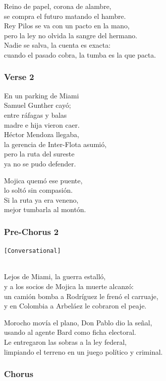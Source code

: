 Reino de papel, corona de alambre,\\
se compra el futuro matando el hambre.\\
Rey Pilos se va con un pacto en la mano,\\
pero la ley no olvida la sangre del hermano.\\
Nadie se salva, la cuenta es exacta:\\
cuando el pasado cobra, la tumba es la que pacta.

\subsubsection{Verse 2}\label{verse-2-18}

En un parking de Miami\\
Samuel Gunther cayó;\\
entre ráfagas y balas\\
madre e hija vieron caer.\\
Héctor Mendoza llegaba,\\
la gerencia de Inter-Flota asumió,\\
pero la ruta del sureste\\
ya no se pudo defender.

Mojica quemó ese puente,\\
lo soltó sin compasión.\\
Si la ruta ya era veneno,\\
mejor tumbarla al montón.

\subsubsection{Pre-Chorus 2}\label{pre-chorus-2-1}

\texttt{{[}Conversational{]}}\strut \\
Lejos de Miami, la guerra estalló,\\
y a los socios de Mojica la muerte alcanzó:\\
un camión bomba a Rodríguez le frenó el carruaje,\\
y en Colombia a Arbeláez le cobraron el peaje.

Morocho movía el plano, Don Pablo dio la señal,\\
usando al agente Bard como ficha electoral.\\
Le entregaron las sobras a la ley federal,\\
limpiando el terreno en un juego político y criminal.

\subsubsection{Chorus}\label{chorus-60}

